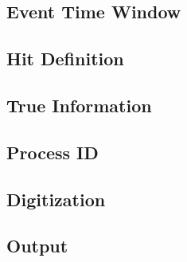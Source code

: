 \subsection{Event Time Window}

\subsection{Hit Definition}

\subsection{True Information}

\subsection{Process ID}

\subsection{Digitization}

\subsection{Output}

